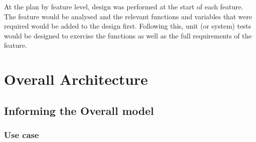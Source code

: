 At the plan by feature level, design was performed at the start of each feature. The feature would be analysed and the relevant functions and variables that were required would be added to the design first. Following this, unit (or system) tests would be designed to exercise the functions as well as the full requirements of the feature.

\section{Overall Architecture}
\subsection{Informing the Overall model}
\subsubsection{Use case}
\begin{figure}[h!]
\end{figure}

